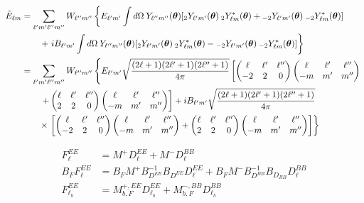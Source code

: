  \begin{align}
     \nonumber \Tilde{E}_{\ell m} &= \sum_{\ell'm'\ell''m''}W_{\ell'' m''}\left\{E_{\ell' m'}\int d\Omega\: Y_{\ell'' m''}(\bm{\theta})[{}_2 Y_{\ell' m'}(\bm{\theta})\:{}_2 Y^*_{\ell m}(\bm{\theta}) + {}_{-2} Y_{\ell' m'}(\bm{\theta})\:{}_{-2} Y^*_{\ell m}(\bm{\theta})]\right.\\
     &\nonumber\left.\quad\quad+~ i B_{\ell' m'}\int d\Omega\: Y_{\ell'' m''}(\bm{\theta})[{}_2 Y_{\ell' m'}(\bm{\theta})\:{}_2 Y^*_{\ell m}(\bm{\theta}) - {}_{-2} Y_{\ell' m'}(\bm{\theta})\:{}_{-2} Y^*_{\ell m}(\bm{\theta})]\right\}\\
     &\nonumber=\sum_{\ell'm'\ell''m''}W_{\ell''m''}\left\{E_{\ell' m'}\sqrt{\frac{(2\ell+1)(2\ell'+1)(2\ell''+1)}{4\pi}}\left[\begin{pmatrix}
         \ell & \ell' & \ell''\\
         -2 & 2 & 0
     \end{pmatrix}\begin{pmatrix}
         \ell & \ell' & \ell''\\
         -m & m' & m''
     \end{pmatrix}\right.\right.\\
     &\nonumber\left.\left.\quad\quad +\begin{pmatrix}
         \ell & \ell' & \ell''\\
         2 & 2 & 0
     \end{pmatrix}\begin{pmatrix}
         \ell & \ell' & \ell''\\
         -m & m' & m''
     \end{pmatrix}\right] + i B_{\ell' m'} \sqrt{\frac{(2\ell+1)(2\ell'+1)(2\ell''+1)}{4\pi}}\right.\\
     &\quad\quad\times\left.\left[\begin{pmatrix}
         \ell & \ell' & \ell''\\
         -2 & 2 & 0
     \end{pmatrix}\begin{pmatrix}
         \ell & \ell' & \ell''\\
         -m & m' & m''
     \end{pmatrix} + \begin{pmatrix}
         \ell & \ell' & \ell''\\
         2 & 2 & 0
     \end{pmatrix}\begin{pmatrix}
         \ell & \ell' & \ell''\\
         -m & m' & m''
     \end{pmatrix}\right]\right\}
 \end{align}

 \begin{align}
     F^{EE}_\ell &= M^+ D^{EE}_\ell + M^- D^{BB}_\ell \\
     B_F F^{EE}_\ell &= B_F M^+ B^{-1}_{D^{EE}} B_{D^{EE}} D^{EE}_\ell + B_F M^- B^{-1}_{D^{BB}} B_{D_{BB}} D^{BB}_\ell \\
     F^{EE}_{\ell_b} &= M^{+, EE}_{b, F} D^{EE}_{\ell_b} + M^{-, BB}_{b, F} D^{BB}_{\ell_b}
 \end{align}
